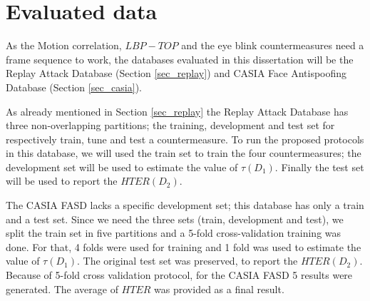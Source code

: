 \section{Evaluated data}

As the Motion correlation, $LBP-TOP$ and the eye blink countermeasures need a frame sequence to work, the databases evaluated in this dissertation will be the Replay Attack Database (Section \ref{sec_replay}) and CASIA Face Antispoofing Database (Section \ref{sec_casia}).

As already mentioned in Section \ref{sec_replay} the Replay Attack Database has three non-overlapping partitions; the training, development and test set for respectively train, tune and test a countermeasure. To run the proposed protocols in this database, we will used the train set to train the four countermeasures; the development set will be used to estimate the value of $\tau(D_1)$. Finally the test set will be used to report the $HTER(D_2)$.

The CASIA FASD lacks a specific development set; this database has only a train and a test set. Since we need the three sets (train, development and test), we split the train set in five partitions and a 5-fold cross-validation training was done. For that, 4 folds were used for training and 1 fold was used to estimate the value of $\tau(D_1)$. The original test set was preserved, to report the $HTER(D_2)$. Because of 5-fold cross validation protocol, for the CASIA FASD 5 results were generated. The average of $HTER$ was provided as a final result.


